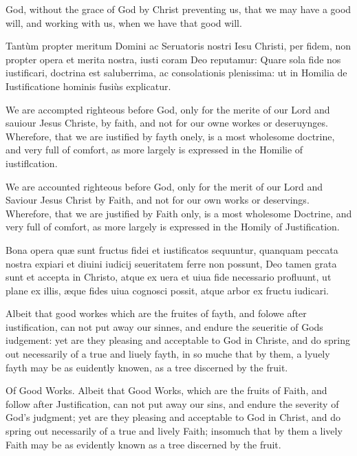God, without the grace of God by Christ preventing us, that we may have a good will, and working with us, when we have that good will.


Tantùm propter meritum Domini ac Seruatoris nostri Iesu Christi, per fidem, non propter opera et merita nostra, iusti coram Deo reputamur: Quare sola fide nos iustificari, doctrina est saluberrima, ac consolationis plenissima: ut in Homilia de Iustificatione hominis fusiùs explicatur.

We are accompted righteous before God, only for the merite of our Lord and sauiour Jesus Christe, by faith, and not for our owne workes or deseruynges. Wherefore, that we are iustified by fayth onely, is a most wholesome doctrine, and very full of comfort, as more largely is expressed in the Homilie of iustiflcation.

We are accounted righteous before God, only for the merit of our Lord and Saviour Jesus Christ by Faith, and not for our own works or deservings. Wherefore, that we are justified by Faith only, is a most wholesome Doctrine, and very full of comfort, as more largely is expressed in the Homily of Justification.


Bona opera quæ sunt fructus fidei et iustificatos sequuntur, quanquam peccata nostra expiari et diuini iudicij seueritatem ferre non possunt, Deo tamen grata sunt et accepta in Christo, atque ex uera et uiua fide necessario profluunt, ut plane ex illis, æque fides uiua cognosci possit, atque arbor ex fructu iudicari.

Albeit that good workes which are the fruites of fayth, and folowe after iustification, can not put away our sinnes, and endure the seueritie of Gods iudgement: yet are they pleasing and acceptable to God in Christe, and do spring out necessarily of a true and liuely fayth, in so muche that by them, a lyuely fayth may be as euidently knowen, as a tree discerned by the fruit.

Of Good Works. Albeit that Good Works, which are the fruits of Faith, and follow after Justification, can not put away our sins, and endure the severity of God's judgment; yet are they pleasing and acceptable to God in Christ, and do spring out necessarily of a true and lively Faith; insomuch that by them a lively Faith may be as evidently known as a tree discerned by the fruit.


